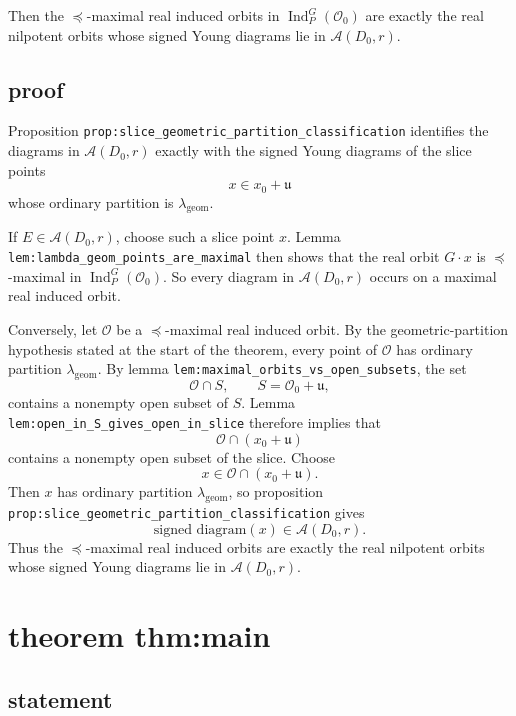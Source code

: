 \documentclass[
]{article}
\begin{document}
Then the \(\preceq\)-maximal real induced orbits in
\(\operatorname{Ind}_P^G(\mathcal O_0)\) are exactly the real nilpotent
orbits whose signed Young diagrams lie in \(\mathcal A(D_0,r)\).

\subsection{proof}\label{proof-26}

Proposition \texttt{prop:slice\_geometric\_partition\_classification}
identifies the diagrams in \(\mathcal A(D_0,r)\) exactly with the signed
Young diagrams of the slice points \[
x\in x_0+\mathfrak u
\] whose ordinary partition is \(\lambda_{\mathrm{geom}}\).

If \(E\in \mathcal A(D_0,r)\), choose such a slice point \(x\). Lemma
\texttt{lem:lambda\_geom\_points\_are\_maximal} then shows that the real
orbit \(G\cdot x\) is \(\preceq\)-maximal in
\(\operatorname{Ind}_P^G(\mathcal O_0)\). So every diagram in
\(\mathcal A(D_0,r)\) occurs on a maximal real induced orbit.

Conversely, let \(\mathcal O\) be a \(\preceq\)-maximal real induced
orbit. By the geometric-partition hypothesis stated at the start of the
theorem, every point of \(\mathcal O\) has ordinary partition
\(\lambda_{\mathrm{geom}}\). By lemma
\texttt{lem:maximal\_orbits\_vs\_open\_subsets}, the set \[
\mathcal O\cap S,
\qquad
S=\mathcal O_0+\mathfrak u,
\] contains a nonempty open subset of \(S\). Lemma
\texttt{lem:open\_in\_S\_gives\_open\_in\_slice} therefore implies that
\[
\mathcal O\cap (x_0+\mathfrak u)
\] contains a nonempty open subset of the slice. Choose \[
x\in \mathcal O\cap(x_0+\mathfrak u).
\] Then \(x\) has ordinary partition \(\lambda_{\mathrm{geom}}\), so
proposition \texttt{prop:slice\_geometric\_partition\_classification}
gives \[
\text{signed diagram}(x)\in \mathcal A(D_0,r).
\] Thus the \(\preceq\)-maximal real induced orbits are exactly the real
nilpotent orbits whose signed Young diagrams lie in
\(\mathcal A(D_0,r)\).

\section{theorem thm:main}\label{theorem-thmmain}

\subsection{statement}\label{statement-27}
\end{document}
